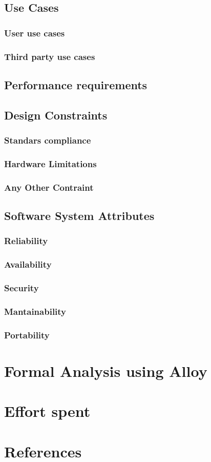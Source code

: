 \documentclass{article}
\begin{document}
\subsection{Use Cases}
\subsubsection{User use cases}
\subsubsection{Third party use cases}
\subsection{Performance requirements}
\subsection{Design Constraints}
\subsubsection{Standars compliance}
\subsubsection{Hardware Limitations}
\subsubsection{Any Other Contraint}
\subsection{Software System Attributes}
\subsubsection{Reliability}
\subsubsection{Availability}
\subsubsection{Security}
\subsubsection{Mantainability}
\subsubsection{Portability}
\section{Formal Analysis using Alloy}
\section{Effort spent}
\section{References}
    
\end{document}
